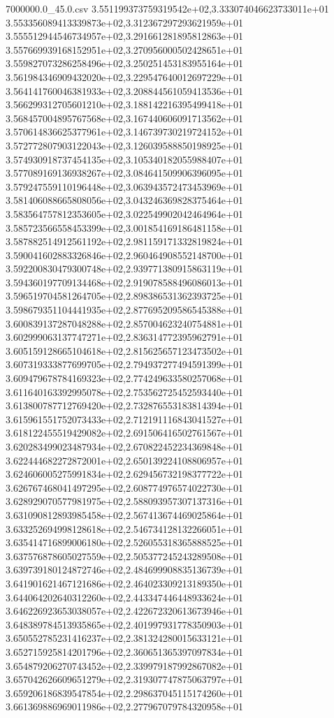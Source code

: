 \begin{filecontents*}{7000000.0_45.0.csv}
3.551199373759319542e+02,3.333074046623733011e+01
3.553356089413339873e+02,3.312367297293621959e+01
3.555512944546734957e+02,3.291661281895812863e+01
3.557669939168152951e+02,3.270956000502428651e+01
3.559827073286258496e+02,3.250251453183955164e+01
3.561984346909432020e+02,3.229547640012697229e+01
3.564141760046381933e+02,3.208844561059413536e+01
3.566299312705601210e+02,3.188142216395499418e+01
3.568457004895767568e+02,3.167440606091713562e+01
3.570614836625377961e+02,3.146739730219724152e+01
3.572772807903122043e+02,3.126039588850198925e+01
3.574930918737454135e+02,3.105340182055988407e+01
3.577089169136938267e+02,3.084641509906396095e+01
3.579247559110196448e+02,3.063943572473453969e+01
3.581406088665808056e+02,3.043246369828375464e+01
3.583564757812353605e+02,3.022549902042464964e+01
3.585723566558453399e+02,3.001854169186481158e+01
3.587882514912561192e+02,2.981159171332819824e+01
3.590041602883326846e+02,2.960464908552148700e+01
3.592200830479300748e+02,2.939771380915863119e+01
3.594360197709134468e+02,2.919078588496086013e+01
3.596519704581264705e+02,2.898386531362393725e+01
3.598679351104441935e+02,2.877695209586545388e+01
3.600839137287048288e+02,2.857004623240754881e+01
3.602999063137747271e+02,2.836314772395962791e+01
3.605159128665104618e+02,2.815625657123473502e+01
3.607319333877699705e+02,2.794937277494591399e+01
3.609479678784169323e+02,2.774249633580257068e+01
3.611640163392995078e+02,2.753562725452593440e+01
3.613800787712769420e+02,2.732876553183814394e+01
3.615961551752073433e+02,2.712191116843041527e+01
3.618122455519429082e+02,2.691506416502761567e+01
3.620283499023487934e+02,2.670822452234369848e+01
3.622444682272872001e+02,2.650139224108806957e+01
3.624606005275991834e+02,2.629456732198377722e+01
3.626767468041497295e+02,2.608774976574022730e+01
3.628929070577981975e+02,2.588093957307137316e+01
3.631090812893985458e+02,2.567413674469025864e+01
3.633252694998128618e+02,2.546734128132266051e+01
3.635414716899006180e+02,2.526055318365888525e+01
3.637576878605027559e+02,2.505377245243289508e+01
3.639739180124872746e+02,2.484699908835136739e+01
3.641901621467121686e+02,2.464023309213189350e+01
3.644064202640312260e+02,2.443347446448933624e+01
3.646226923653038057e+02,2.422672320613673946e+01
3.648389784513935865e+02,2.401997931778350903e+01
3.650552785231416237e+02,2.381324280015633121e+01
3.652715925814201796e+02,2.360651365397097834e+01
3.654879206270743452e+02,2.339979187992867082e+01
3.657042626609651279e+02,2.319307747875063797e+01
3.659206186839547854e+02,2.298637045115174260e+01
3.661369886969011986e+02,2.277967079784320958e+01

\end{filecontents*}
